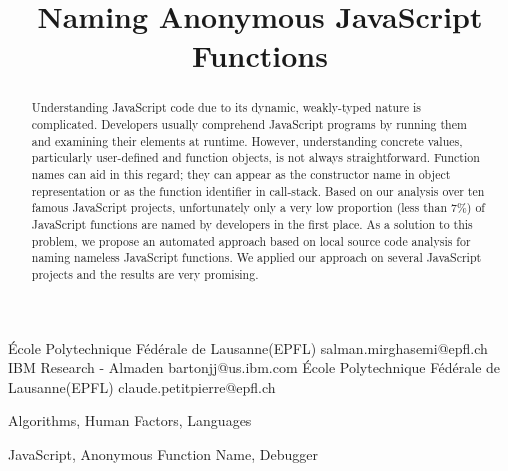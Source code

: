 \documentclass[10pt, preprint]{sigplanconf}
\begin{document}
\copyrightdata{[to be supplied]} 


\title{Naming Anonymous JavaScript Functions}

           {\'Ecole Polytechnique F\'ed\'erale de Lausanne(EPFL)}
           {salman.mirghasemi@epfl.ch}
           {IBM Research - Almaden}
           {bartonjj@us.ibm.com} 
           {\'Ecole Polytechnique F\'ed\'erale de Lausanne(EPFL)}
           {claude.petitpierre@epfl.ch}

\maketitle

\begin{abstract}
Understanding JavaScript code due to its dynamic, weakly-typed nature is complicated. Developers usually comprehend JavaScript programs by running them and examining their elements at runtime. However, understanding concrete values, particularly user-defined and function objects, is not always straightforward. Function names can aid in this regard; they can appear as the constructor name in object representation or as the function identifier in call-stack. Based on our analysis over ten famous JavaScript projects, unfortunately only a very low proportion (less than 7\%) of JavaScript functions are named by developers in the first place. As a solution to this problem, we propose an automated approach based on local source code analysis for naming nameless JavaScript functions. We applied our approach on several JavaScript projects and the results are very promising.
\end{abstract}


\terms
Algorithms, Human Factors, Languages

\keywords
JavaScript, Anonymous Function Name, Debugger
\end{document}
